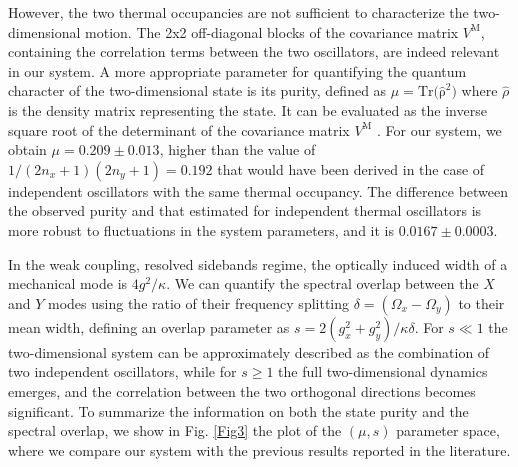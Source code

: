 \documentclass[11pt,floatfix,amssymb,prx,aps,longbibliography,superscriptaddress,nopacs]{revtex4-2}
\newcommand{\Vm}{V^{\scriptscriptstyle{\mathrm{M}}}}
\newcommand{\nX}{n_{\scriptstyle{x}}}
\newcommand{\nY}{n_{\scriptstyle{y}}}
\newcommand{\OmegaX}{\Omega_{\scriptstyle{x}}}
\newcommand{\OmegaY}{\Omega_{\scriptstyle{y}}}
\newcommand{\gX}{g_{\scriptstyle{x}}}
\newcommand{\gY}{g_{\scriptstyle{y}}}
\newcommand{\supp}{s}
\begin{document}
However, the two thermal occupancies are not sufficient to characterize the two-dimensional motion. The 2x2 off-diagonal blocks of the covariance matrix $\Vm$, containing the correlation terms between the two oscillators, are indeed relevant in our system. A more appropriate parameter for quantifying the quantum character of the two-dimensional state is its purity, defined as
$\mu = \mathrm{Tr (\hat{\rho}^2})$
where $\hat{\rho}$ is the density matrix representing the state. It can be evaluated as the inverse square root of the determinant of the covariance matrix $\Vm$ \cite{Serafini2004,Borkje2023}. For our system, we obtain $\mu = 0.209\pm0.013$, higher than the value of $1/(2 \nX+1)(2 \nY+1) = 0.192$ that would have been derived in the case of independent oscillators with the same thermal occupancy. 
The difference between the observed purity and that
estimated for independent thermal oscillators is more
robust to fluctuations in the system parameters, and it is $0.0167\pm0.0003$.

In the weak coupling, resolved sidebands regime, the optically induced width of a mechanical mode is $ 4 g^2/\kappa$. We can quantify the spectral overlap between the $X$ and $Y$ modes using the ratio of their frequency splitting $\delta = (\OmegaX-\OmegaY)$ to their mean width, defining an overlap parameter as $\supp = 2 (\gX^2+\gY^2)/\kappa \delta$. 
For $\supp \ll 1 $
the two-dimensional system can be approximately described as the combination of two independent oscillators, while for  $\supp \ge 1$ 
the full two-dimensional dynamics emerges, and the correlation between the two orthogonal directions becomes significant. To summarize the information on both the state purity and the spectral overlap, we show in Fig. \ref{Fig3} the plot of the $(\mu, \supp)$  
parameter space, where we compare our system with the previous results reported in the literature. 
\end{document}
